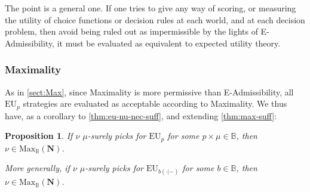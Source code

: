 \documentclass[a4paper]{article}
\newtheorem{proposition}[theorem]{Proposition}
\newcommand\N{\mathbf{N}}
\renewcommand\P{\mathbb{P}} %
\newcommand\EU{\mathrm{EU}}
\newcommand\EAd{\mathrm{EAd}}
\newcommand\Maximality{\mathrm{Max}}
\newcommand{\IB}{\mathbb{B}}
\newcommand{\IP}{\P}
\newcommand{\pb}{b}
\newcommand{\todoinfo}[2][]{\todo[backgroundcolor=orange!80,bordercolor=black,linecolor=gray!80, #1,inline,caption={}]{#2}}
\renewcommand{\color}[1]{}
\newcommand\SetDelimiter[1][]{
	\nonscript\,#1\vert \allowbreak \nonscript\,\mathopen{}}
\providecommand\given{\SetDelimiter}
\newenvironment{CCM rewritten}
{\begingroup\color{blue}} %
{\endgroup}              %
\begin{document}



\begin{comment}
So, at least when we consider regular probabilistic picking strategies, things have become pretty bad for E-Admissibility: given some reasonable constraints on your uncertainty about the decision problem you'll face, the regular probabilistic picking strategies that pick for E-Admissibility are not themselves E-Admissible. And so, in this sense, E-Admissibility is self-undermining.

{
	There is a more fundamental point here: however one is going to judge choice functions, each probability, $p$, will think that $\EU_p$ is optimal; and so E-Admissibility will only judge expected utility theory as acceptable. When we considered (deterministic) strategies, we were accepting $\EU$ strategies as E-Admissibility strategies, so had some E-Admissibility strategies evaluated as E-Admissible. However, if we are judging the choice function by assigning a single evaluation of it, taking the imprecision into account, it will distinguish it from expected utility theory,  and thus all probability functions will think something else is better, namely being $\EU_p$ for the $p$ doing the evaluation; and thus, E-Admissibility is not itself E-Admissible. 
	}

\end{comment}


{\color{blue}
The point is a general one. If one tries to give any way of scoring, or measuring the utility of choice functions or decision rules at each world, and at each decision problem, then avoid being ruled out as impermissible by the lights of E-Admissibility, it must be evaluated as equivalent to expected utility theory. 
 \todoinfo{this new}
}

\subsubsection{Maximality}\label{sect:nu:Max}


As in \cref{sect:Max}, since Maximality is more permissive than E-Admissibility, all $\EU_p$ strategies are evaluated as acceptable according to Maximality. We thus have, as a corollary to \cref{thm:eu-nu-nec-suff}, and extending \cref{thm:max-suff}:
\begin{proposition}\label{thm:max-nu-suff}
		If $\nu$ $\mu$-surely picks for $\EU_{p}$ for some $p\times\mu\in \IB$, then $\nu\in\Maximality_\IB(\N)$. 
		
		More generally, if $\nu$ $\mu$-surely picks for $\EU_{\pb(\cdot|-)}$ for some $\pb\in \IB$, then $\nu\in\Maximality_\IB(\N)$. 
\end{proposition}
\end{document}
